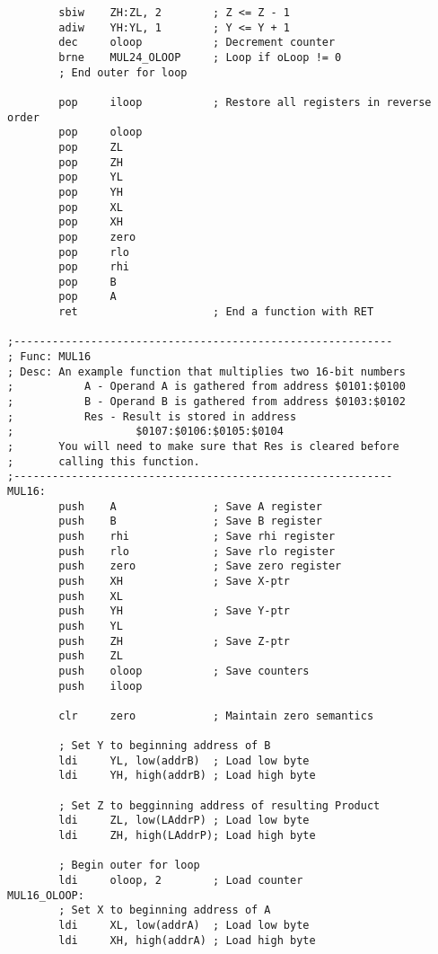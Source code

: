 \documentclass[12pt,letterpaper]{article}
\begin{document}
\begin{verbatim}
        sbiw    ZH:ZL, 2        ; Z <= Z - 1
        adiw    YH:YL, 1        ; Y <= Y + 1
        dec     oloop           ; Decrement counter
        brne    MUL24_OLOOP     ; Loop if oLoop != 0
        ; End outer for loop
                
        pop     iloop           ; Restore all registers in reverse order
        pop     oloop
        pop     ZL              
        pop     ZH
        pop     YL
        pop     YH
        pop     XL
        pop     XH
        pop     zero
        pop     rlo
        pop     rhi
        pop     B
        pop     A
        ret                     ; End a function with RET

;-----------------------------------------------------------
; Func: MUL16
; Desc: An example function that multiplies two 16-bit numbers
;           A - Operand A is gathered from address $0101:$0100
;           B - Operand B is gathered from address $0103:$0102
;           Res - Result is stored in address 
;                   $0107:$0106:$0105:$0104
;       You will need to make sure that Res is cleared before
;       calling this function.
;-----------------------------------------------------------
MUL16:
        push    A               ; Save A register
        push    B               ; Save B register
        push    rhi             ; Save rhi register
        push    rlo             ; Save rlo register
        push    zero            ; Save zero register
        push    XH              ; Save X-ptr
        push    XL
        push    YH              ; Save Y-ptr
        push    YL              
        push    ZH              ; Save Z-ptr
        push    ZL
        push    oloop           ; Save counters
        push    iloop               

        clr     zero            ; Maintain zero semantics

        ; Set Y to beginning address of B
        ldi     YL, low(addrB)  ; Load low byte
        ldi     YH, high(addrB) ; Load high byte

        ; Set Z to begginning address of resulting Product
        ldi     ZL, low(LAddrP) ; Load low byte
        ldi     ZH, high(LAddrP); Load high byte

        ; Begin outer for loop
        ldi     oloop, 2        ; Load counter
MUL16_OLOOP:
        ; Set X to beginning address of A
        ldi     XL, low(addrA)  ; Load low byte
        ldi     XH, high(addrA) ; Load high byte


\end{verbatim}
\end{document}
